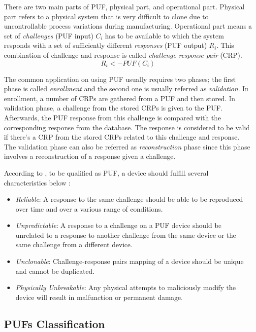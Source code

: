 There are two main parts of PUF, physical part, and operational part. Physical part refers to a physical system that is very difficult to clone due to uncontrollable process variations during manufacturing. Operational part means a set of \textit{challenges} (PUF input) $C_i$ has to be available to which the system responds with a set of sufficiently different \textit{responses} (PUF output) $R_i$. This combination of challenge and response is called \textit{challenge-response-pair} (CRP).
\begin{equation}
R_i <- PUF(C_i)
\end{equation}

The common application on using PUF usually requires two phases; the first phase is called \textit{enrollment} and the second one is usually referred as \textit{validation}. In enrollment, a number of CRPs are gathered from a PUF and then stored. In validation phase, a challenge from the stored CRPs is given to the PUF. Afterwards, the PUF response from this challenge is compared with the corresponding response from the database. The response is considered to be valid if there's a CRP from the stored CRPs related to this challenge and response. The validation phase can also be referred as \textit{reconstruction} phase since this phase involves a reconstruction of a response given a challenge.

According to \cite{retrospective}, to be qualified as PUF, a device should fulfill several characteristics below :
\begin{itemize}
\item \textit{Reliable}: A response to the same challenge should be able to be reproduced over time and over a various range of conditions.
\item \textit{Unpredictable}: A response to a challenge on a PUF device should be unrelated to a response to another challenge from the same device or the same challenge from a different device.
\item \textit{Unclonable}: Challenge-response pairs mapping of a device should be unique and cannot be duplicated.
\item \textit{Physically Unbreakable}: Any physical attempts to maliciously modify the device will result in malfunction or permanent damage.
\end{itemize}

\subsection{PUFs Classification} \label{lbl:puf-classification}

